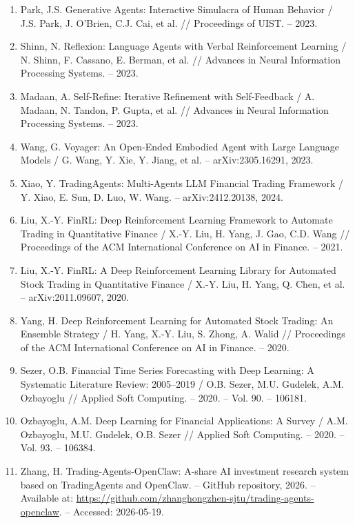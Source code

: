 \documentclass[14pt,a4paper]{extarticle}
\newcommand{\StartAppendixA}{%
  \clearpage
  \appendix
  \setcounter{figure}{0}
  \setcounter{table}{0}
  \setcounter{equation}{0}
  \renewcommand{\thefigure}{A.\arabic{figure}}
  \renewcommand{\thetable}{A.\arabic{table}}
  \renewcommand{\theequation}{A.\arabic{equation}}
}
\begin{document}
\begin{enumerate}[label=\arabic*., leftmargin=1.25cm]
  \item Park, J.S. Generative Agents: Interactive Simulacra of Human Behavior / J.S. Park, J. O'Brien, C.J. Cai, et al. // Proceedings of UIST. -- 2023.
  \item Shinn, N. Reflexion: Language Agents with Verbal Reinforcement Learning / N. Shinn, F. Cassano, E. Berman, et al. // Advances in Neural Information Processing Systems. -- 2023.
  \item Madaan, A. Self-Refine: Iterative Refinement with Self-Feedback / A. Madaan, N. Tandon, P. Gupta, et al. // Advances in Neural Information Processing Systems. -- 2023.
  \item Wang, G. Voyager: An Open-Ended Embodied Agent with Large Language Models / G. Wang, Y. Xie, Y. Jiang, et al. -- arXiv:2305.16291, 2023.
  \item Xiao, Y. TradingAgents: Multi-Agents LLM Financial Trading Framework / Y. Xiao, E. Sun, D. Luo, W. Wang. -- arXiv:2412.20138, 2024.
  \item Liu, X.-Y. FinRL: Deep Reinforcement Learning Framework to Automate Trading in Quantitative Finance / X.-Y. Liu, H. Yang, J. Gao, C.D. Wang // Proceedings of the ACM International Conference on AI in Finance. -- 2021.
  \item Liu, X.-Y. FinRL: A Deep Reinforcement Learning Library for Automated Stock Trading in Quantitative Finance / X.-Y. Liu, H. Yang, Q. Chen, et al. -- arXiv:2011.09607, 2020.
  \item Yang, H. Deep Reinforcement Learning for Automated Stock Trading: An Ensemble Strategy / H. Yang, X.-Y. Liu, S. Zhong, A. Walid // Proceedings of the ACM International Conference on AI in Finance. -- 2020.
  \item Sezer, O.B. Financial Time Series Forecasting with Deep Learning: A Systematic Literature Review: 2005--2019 / O.B. Sezer, M.U. Gudelek, A.M. Ozbayoglu // Applied Soft Computing. -- 2020. -- Vol. 90. -- 106181.
  \item Ozbayoglu, A.M. Deep Learning for Financial Applications: A Survey / A.M. Ozbayoglu, M.U. Gudelek, O.B. Sezer // Applied Soft Computing. -- 2020. -- Vol. 93. -- 106384.
  \item Zhang, H. Trading-Agents-OpenClaw: A-share AI investment research system based on TradingAgents and OpenClaw. -- GitHub repository, 2026. -- Available at: \url{https://github.com/zhanghongzhen-sjtu/trading-agents-openclaw}. -- Accessed: 2026-05-19.
\end{enumerate}\StartAppendixA
\end{document}
